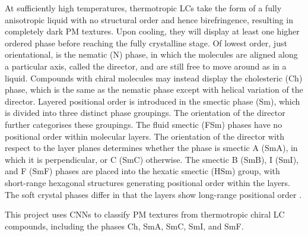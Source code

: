 \documentclass[12pt]{article}
\begin{document}
At sufficiently high temperatures, thermotropic LCs take the form of a fully anisotropic liquid with no structural order and hence birefringence, resulting in completely dark PM textures. Upon cooling, they will display at least one higher ordered phase before reaching the fully crystalline stage. Of lowest order, just orientational, is the nematic (N) phase, in which the molecules are aligned along a particular axis, called the director, and are still free to move around as in a liquid. Compounds with chiral molecules may instead display the cholesteric (Ch) phase, which is the same as the nematic phase except with helical variation of the director. Layered positional order is introduced in the smectic phase (Sm), which is divided into three distinct phase groupings. The orientation of the director further categorises these groupings. The fluid smectic (FSm) phases have no positional order within molecular layers. The orientation of the director with respect to the layer planes determines whether the phase is smectic A (SmA), in which it is perpendicular, or C (SmC) otherwise. The smectic B (SmB), I (SmI), and F (SmF) phases are placed into the hexatic smectic (HSm) group, with short-range hexagonal structures generating positional order within the layers. The soft crystal phases differ in that the layers show long-range positional order \cite{Dierking03}.

This project uses CNNs to classify PM textures from thermotropic chiral LC compounds, including the phases Ch, SmA, SmC, SmI, and SmF.  
\end{document}
